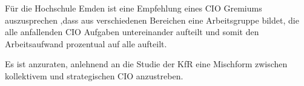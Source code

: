 Für die Hochschule Emden ist eine Empfehlung eines CIO Gremiums auszusprechen ,dass aus verschiedenen Bereichen eine Arbeitsgruppe bildet, die alle anfallenden CIO Aufgaben untereinander aufteilt und somit den Arbeitsaufwand prozentual auf alle aufteilt. 

Es ist anzuraten, anlehnend an die Studie der KfR eine Mischform zwischen kollektivem und strategischen CIO anzustreben.